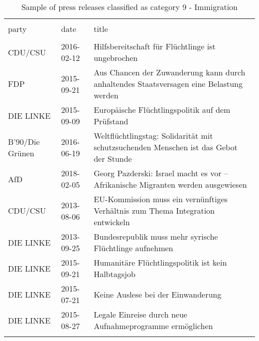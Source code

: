 
\begin{table}[!htbp] \centering 
  \caption{Sample of press releases classified as category 9 - Immigration} 
  \label{tab:9-document-samples} 
\begin{tabularx}{\textwidth}{stX} 
\\[-1.8ex]\hline 
\hline \\[-1.8ex] 
party & date & title \\ 
\hline \\[-1.8ex] 
CDU/CSU & 2016-02-12 & Hilfsbereitschaft für Flüchtlinge ist ungebrochen \\ 
FDP & 2015-09-21 & Aus Chancen der Zuwanderung kann durch anhaltendes Staatsversagen eine Belastung werden \\ 
DIE LINKE & 2015-09-09 & Europäische Flüchtlingspolitik auf dem Prüfstand \\ 
B'90/Die Grünen & 2016-06-19 & Weltflüchtlingstag: Solidarität mit schutzsuchenden Menschen ist das Gebot der Stunde \\ 
AfD & 2018-02-05 & Georg Pazderski: Israel macht es vor – Afrikanische Migranten werden ausgewiesen \\ 
CDU/CSU & 2013-08-06 & EU-Kommission muss ein vernünftiges Verhältnis zum Thema Integration entwickeln \\ 
DIE LINKE & 2013-09-25 & Bundesrepublik muss mehr syrische Flüchtlinge aufnehmen \\ 
DIE LINKE & 2015-09-21 & Humanitäre Flüchtlingspolitik ist kein Halbtagsjob \\ 
DIE LINKE & 2015-07-21 & Keine Auslese bei der Einwanderung \\ 
DIE LINKE & 2015-08-27 & Legale Einreise durch neue Aufnahmeprogramme ermöglichen \\ 
\hline \\[-1.8ex] 
\end{tabularx} 
\end{table} 
